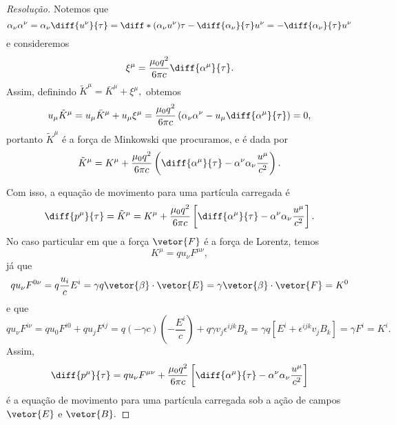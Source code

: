 \begin{proof}[Resolução]
   Notemos que
   \begin{equation*}
      \alpha_\nu \alpha^\nu = \alpha_\nu \diff{u^\nu}{\tau} = \diff*{(\alpha_\nu u^\nu)}{\tau} - \diff{\alpha_\nu}{\tau} u^\nu = - \diff{\alpha_\nu}{\tau} u^\nu
   \end{equation*}
   e consideremos
   \begin{equation*}
      \xi^\mu = \frac{\mu_0q^2}{6\pi c} \diff{\alpha^\mu}{\tau}.
   \end{equation*}
   Assim, definindo \(\tilde{K}^\mu = \bar{K}^\mu + \xi^\mu,\) obtemos
   \begin{equation*}
      u_\mu \tilde{K}^\mu = u_\mu \bar{K}^\mu + u_\mu \xi^\mu = \frac{\mu_0 q^2}{6\pi c}\left(\alpha_\nu \alpha^\nu - u_\mu \diff{\alpha^\mu}{\tau}\right) = 0,
   \end{equation*}
   portanto \(\tilde{K}^\mu\) é a força de Minkowski que procuramos, e é dada por
   \begin{equation*}
      \tilde{K}^\mu = K^\mu + \frac{\mu_0 q^2}{6\pi c}\left(\diff{\alpha^\mu}{\tau} - \alpha^\nu \alpha_\nu \frac{u^\mu}{c^2}\right).
   \end{equation*}
 
   Com isso, a equação de movimento para uma partícula carregada é
   \begin{equation*}
      \diff{p^\mu}{\tau} = \tilde{K}^\mu = K^\mu + \frac{\mu_0q^2}{6\pi c}\left[\diff{\alpha^\mu}{\tau} - \alpha^\nu \alpha_\nu \frac{u^\mu}{c^2}\right].
   \end{equation*}
   No caso particular em que a força \(\vetor{F}\) é a força de Lorentz, temos
   \begin{equation*}
      K^\mu = q u_\nu F^{\mu\nu},
   \end{equation*}
   já que
   \begin{equation*}
      q u_\nu F^{0\nu} = q\frac{u_i}{c} E^i = \gamma q \vetor{\beta} \cdot \vetor{E} = \gamma \vetor{\beta} \cdot \vetor{F} = K^0
   \end{equation*}
   e que
   \begin{equation*}
      q u_\nu F^{i\nu} = q u_0 F^{i0} + q u_j F^{ij} = q (-\gamma c) \left(-\frac{E^i}{c}\right) + q \gamma v_j \epsilon^{ijk} B_k = \gamma q\left[E^i + \epsilon^{ijk} v_j B_k\right] = \gamma F^i = K^i.
   \end{equation*}
   Assim,
   \begin{equation*}
      \diff{p^\mu}{\tau} = q u_\nu F^{\mu\nu} + \frac{\mu_0 q^2}{6\pi c}\left[\diff{\alpha^\mu}{\tau} - \alpha^\nu \alpha_\nu \frac{u^\mu}{c^2}\right]
   \end{equation*}
   é a equação de movimento para uma partícula carregada sob a ação de campos \(\vetor{E}\) e \(\vetor{B}.\)
\end{proof}
